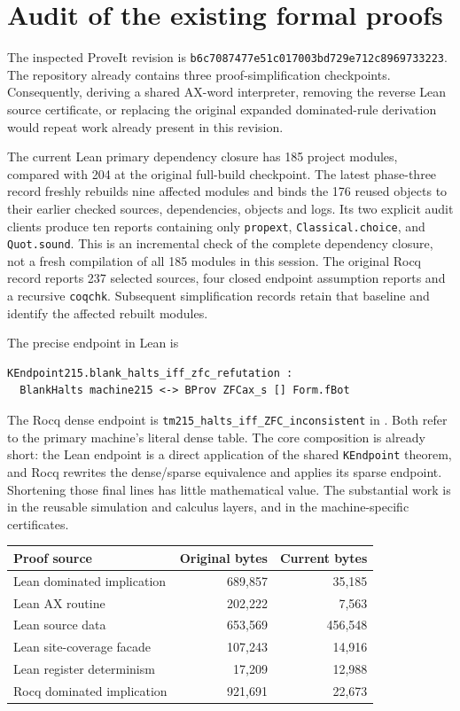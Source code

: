 \section{Audit of the existing formal proofs}
\label{sec:proof-audit}

The inspected ProveIt revision is
\texttt{b6c7087477e51c017003bd729e712c8969733223}.
The repository already contains three proof-simplification checkpoints.
Consequently, deriving a shared AX-word interpreter, removing the reverse
Lean source certificate, or replacing the original expanded dominated-rule
derivation would repeat work already present in this revision.\cite{verification,phase3}

The current Lean primary dependency closure has 185 project modules,
compared with 204 at the original full-build checkpoint. The latest
phase-three record freshly rebuilds nine affected modules and binds the
176 reused objects to their earlier checked sources, dependencies, objects
and logs. Its two explicit audit clients produce ten reports containing
only \texttt{propext}, \texttt{Classical.choice}, and \texttt{Quot.sound}.
This is an incremental check of the complete dependency closure, not a
fresh compilation of all 185 modules in this session. The original Rocq
record reports 237 selected sources, four closed endpoint assumption
reports and a recursive \texttt{coqchk}. Subsequent simplification records
retain that baseline and identify the affected rebuilt modules.

The precise endpoint in Lean is
\begin{verbatim}
KEndpoint215.blank_halts_iff_zfc_refutation :
  BlankHalts machine215 <-> BProv ZFCax_s [] Form.fBot
\end{verbatim}
The Rocq dense endpoint is
\texttt{tm215\_halts\_iff\_ZFC\_inconsistent} in
.
Both refer to the primary machine's literal dense table. The core
composition is already short: the Lean endpoint is a direct application
of the shared \texttt{KEndpoint} theorem, and Rocq rewrites the dense/sparse
equivalence and applies its sparse endpoint. Shortening those final lines
has little mathematical value. The substantial work is in the reusable
simulation and calculus layers, and in the machine-specific certificates.\cite{endpoint}

\begin{center}
\begin{tabular}{lrr}
\hline
Proof source & Original bytes & Current bytes\\
\hline
Lean dominated implication & 689,857 & 35,185\\
Lean AX routine & 202,222 & 7,563\\
Lean source data & 653,569 & 456,548\\
Lean site-coverage facade & 107,243 & 14,916\\
Lean register determinism & 17,209 & 12,988\\
Rocq dominated implication & 921,691 & 22,673\\
\hline
\end{tabular}
\end{center}

